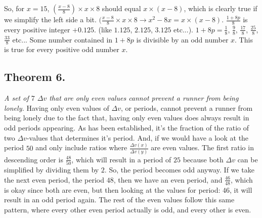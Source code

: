 \documentclass[12pt, a4paper]{article}
\begin{document}
So, for $x=15$, $(\frac{x-8}{8})\times x \times 8$ should equal $x \times (x-8)$, which is clearly true if we simplify the left side a bit. $(\frac{x-8}{8}\times x \times 8 \rightarrow x^2-8x = x\times (x-8)$.
\newline
\newline
$\frac{1+8p}{8}$ is every positive integer $+ 0.125$. (like $1.125$, $2.125$, $3.125$ etc...). \newline $1+8p= \frac{1}{8}$, $\frac{9}{8}$, $\frac{17}{8}$, $\frac{25}{8}$, $\frac{33}{8}$ etc... \newline Some number contained in $1+8p$ is divisible by an odd number $x$. This is true for every positive odd number $x$. 

\subsection*{Theorem 6.}\textit{A set of $7$ $\Delta v$ that are only even values cannot prevent a runner from being lonely.}
\newline
\newline
Having only even values of $\Delta v$, or periods, cannot prevent a runner from being lonely due to the fact that, having only even values does always result in odd periods appearing. As has been established, it's the fraction of the ratio of two $\Delta v$-values that determines it's period. And, if we would have a look at the period $50$ and only include ratios where $\frac{\Delta v(x)}{\Delta v(y)}$ are even values.
\newline
\newline
The first ratio in descending order is $\frac{48}{50}$, which will result in a period of $25$ because both $\Delta v$ can be simplified by dividing them by $2$. So, the period becomes odd anyway. If we take the next even period, the period $48$, then we have an even period, and $\frac{46}{48}$, which is okay since both are even, but then looking at the values for period: $46$, it will result in an odd period again. The rest of the even values follow this same pattern, where every other even period actually is odd, and every other is even.
\end{document}
